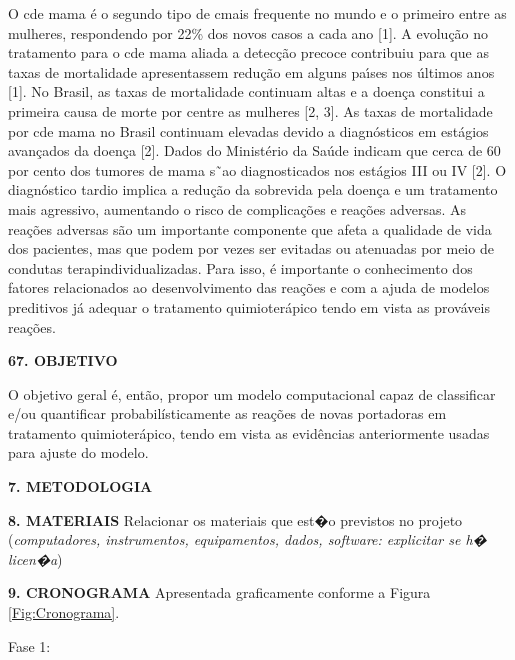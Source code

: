 \documentclass[a4paper,12pt,oneside,openany]{report}
\begin{document}
O c de mama \'e o segundo tipo de c mais frequente no mundo e o primeiro entre as mulheres, respondendo por 22\% dos novos casos a cada ano [1].  A evolu\c{c}\~ao no tratamento para o c de mama aliada a detec\c{c}\~ao precoce contribuiu para que as taxas de mortalidade apresentassem redu\c{c}\~ao em alguns pa\'ıses nos \'ultimos anos [1]. No Brasil, as taxas de mortalidade continuam altas e a doen\c{c}a constitui a primeira causa de morte por c entre as mulheres [2, 3]. As taxas de mortalidade por c de mama no Brasil continuam elevadas devido a diagn\'osticos em est\'agios avan\c{c}ados da doen\c{c}a [2]. Dados do Minist\'erio da Sa\'ude indicam que cerca de 60 por cento dos tumores de mama s˜ao diagnosticados nos est\'agios III ou IV [2].  O diagn\'ostico tardio implica a redu\c{c}\~ao da sobrevida pela doen\c{c}a e um tratamento mais agressivo, aumentando o risco de complica\c{c}\~oes e rea\c{c}\~oes adversas. As rea\c{c}\~oes adversas s\~ao um importante componente que afeta a qualidade de vida dos pacientes, mas que podem por vezes ser evitadas ou atenuadas por meio de condutas terap individualizadas. Para isso, \'e importante o
conhecimento dos fatores relacionados ao desenvolvimento das rea\c{c}\~oes e com a ajuda de modelos preditivos j\'a adequar o tratamento quimioter\'apico tendo em vista as prov\'aveis rea\c{c}\~oes.


\textbf{67. OBJETIVO}

O objetivo geral \'e, então, propor um modelo computacional capaz de classificar e/ou quantificar probabil\'isticamente as rea\c{c}\~oes de novas portadoras em tratamento quimioter\'apico, tendo em vista as evid\^encias anteriormente usadas para ajuste do modelo. %

\vspace{0.4cm}
\textbf{7. METODOLOGIA}


\vspace{0.4cm}
\textbf{8. MATERIAIS}
Relacionar os materiais que est�o previstos no projeto (\textit{computadores, instrumentos, equipamentos, dados, software: explicitar se h� licen�a})

\vspace{0.4cm}
\textbf{9. CRONOGRAMA}
Apresentada graficamente conforme a Figura \ref{Fig:Cronograma}.

Fase 1: 
\end{document}
